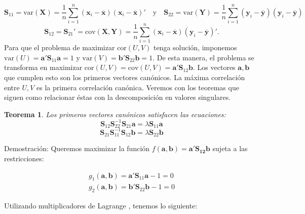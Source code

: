 \documentclass[tfg,cienciasbased,lot,lof,covers,final,overleaf,nocopyright]{tfgtfmthesisuam}
\newtheorem{teor}{Teorema}[chapter]
\begin{document}
\begin{equation*}
        \mathbf{S}_{11} = \mbox{var}(\mathbf{X}) = \frac{1}{n} \sum_{i=1}^{n} (\mathbf{x}_i - \mathbf{\overline{x}})(\mathbf{x}_i - \mathbf{\overline{x}})' \quad \mbox{y} \quad
        \mathbf{S}_{22} = \mbox{var}(\mathbf{Y}) = \frac{1}{n} \sum_{i=1}^{n} (\mathbf{y}_i - \mathbf{\overline{y}})(\mathbf{y}_i - \mathbf{\overline{y}})
\end{equation*}
\begin{equation*}
    \mathbf{S}_{12} = \mathbf{S}_{21}' = \mbox{cov}(\mathbf{X}, \mathbf{Y}) = \frac{1}{n} \sum_{i=1}^{n} (\mathbf{x}_i - \mathbf{\overline{x}})(\mathbf{y}_i - \mathbf{\overline{y}})'.
\end{equation*}
Para que el problema de maximizar $\mbox{cor}(U, V)$ tenga solución, imponemos $\mbox{var}(U) = \mathbf{a'S}_{11}\mathbf{a} = 1$ y $\mbox{var}(V) = \mathbf{b'S}_{22}\mathbf{b} = 1$. De esta manera, el problema se transforma en maximizar $\mbox{cor}(U, V) = \mbox{cov}(U, V) = \mathbf{a}'\mathbf{S}_{12}\mathbf{b}$. Los vectores $\mathbf{a}, \mathbf{b}$ que cumplen esto son los primeros vectores canónicos. La máxima correlación entre $U, V$ es la primera correlación canónica. Veremos con los teoremas que siguen como relacionar éstas con la descomposición en valores singulares. 
\begin{teor}\label{CC1}
    Los primeros vectores canónicos satisfacen las ecuaciones:\\
    $$\mathbf{S}_{12}\mathbf{S}_{22}^{-1}\mathbf{S}_{21}\mathbf{a} = \lambda \mathbf{S}_{11}\mathbf{a}$$
    $$\mathbf{S}_{21}\mathbf{S}_{11}^{-1}\mathbf{S}_{12}\mathbf{b} = \lambda \mathbf{S}_{22}\mathbf{b}$$
\end{teor}
Demostración:
Queremos maximizar la función $f(\mathbf{a}, \mathbf{b}) = \mathbf{a'S_{12}b}$ sujeta a las restricciones:

\begin{eqnarray*}
    g_1(\mathbf{a}, \mathbf{b}) = \mathbf{a'S}_{11}\mathbf{a} - 1 = 0\\
    g_2(\mathbf{a}, \mathbf{b}) = \mathbf{b'S}_{22}\mathbf{b} - 1 = 0
\end{eqnarray*}

Utilizando multiplicadores de Lagrange \cite{Marsden}, tenemos lo siguiente:
\end{document}

